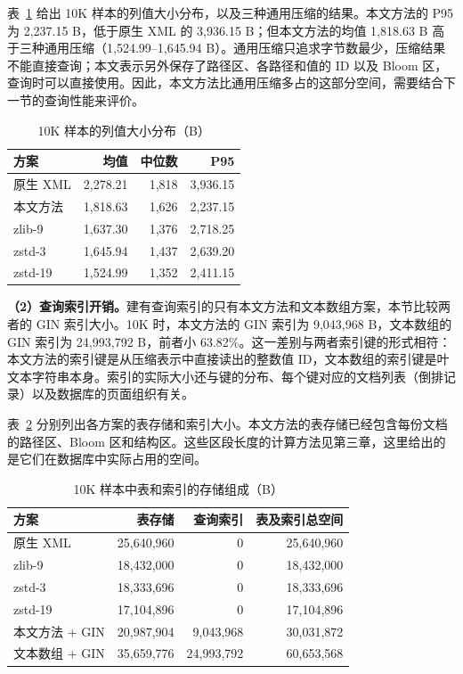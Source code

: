 表~\ref{tab:exp-column-distribution} 给出 10K 样本的列值大小分布，以及三种通用压缩的结果。本文方法的 P95 为 2,237.15 B，低于原生 XML 的 3,936.15 B；但本文方法的均值 1,818.63 B 高于三种通用压缩（1,524.99--1,645.94 B）。通用压缩只追求字节数最少，压缩结果不能直接查询；本文表示另外保存了路径区、各路径和值的 ID 以及 Bloom 区，查询时可以直接使用。因此，本文方法比通用压缩多占的这部分空间，需要结合下一节的查询性能来评价。
\begin{table}[htbp]
\centering\small
\caption{10K 样本的列值大小分布（B）}
\label{tab:exp-column-distribution}
\begin{tabular}{lrrr}
\toprule
方案 & 均值 & 中位数 & P95 \\
\midrule
原生 XML & 2,278.21 & 1,818 & 3,936.15 \\
本文方法 & 1,818.63 & 1,626 & 2,237.15 \\
zlib-9 & 1,637.30 & 1,376 & 2,718.25 \\
zstd-3 & 1,645.94 & 1,437 & 2,639.20 \\
zstd-19 & 1,524.99 & 1,352 & 2,411.15 \\
\bottomrule
\end{tabular}
\end{table}

\textbf{（2）查询索引开销。}建有查询索引的只有本文方法和文本数组方案，本节比较两者的 GIN 索引大小。10K 时，本文方法的 GIN 索引为 9,043,968 B，文本数组的 GIN 索引为 24,993,792 B，前者小 63.82\%。这一差别与两者索引键的形式相符：本文方法的索引键是从压缩表示中直接读出的整数值 ID，文本数组的索引键是叶文本字符串本身。索引的实际大小还与键的分布、每个键对应的文档列表（倒排记录）以及数据库的页面组织有关。

表~\ref{tab:exp-relation-storage} 分别列出各方案的表存储和索引大小。本文方法的表存储已经包含每份文档的路径区、Bloom 区和结构区。这些区段长度的计算方法见第三章，这里给出的是它们在数据库中实际占用的空间。
\begin{table}[htbp]
\centering\small
\caption{10K 样本中表和索引的存储组成（B）}
\label{tab:exp-relation-storage}
\begin{tabular}{lrrr}
\toprule
方案 & 表存储 & 查询索引 & 表及索引总空间 \\
\midrule
原生 XML & 25,640,960 & 0 & 25,640,960 \\
zlib-9 & 18,432,000 & 0 & 18,432,000 \\
zstd-3 & 18,333,696 & 0 & 18,333,696 \\
zstd-19 & 17,104,896 & 0 & 17,104,896 \\
本文方法 + GIN & 20,987,904 & 9,043,968 & 30,031,872 \\
文本数组 + GIN & 35,659,776 & 24,993,792 & 60,653,568 \\
\bottomrule
\end{tabular}
\end{table}

